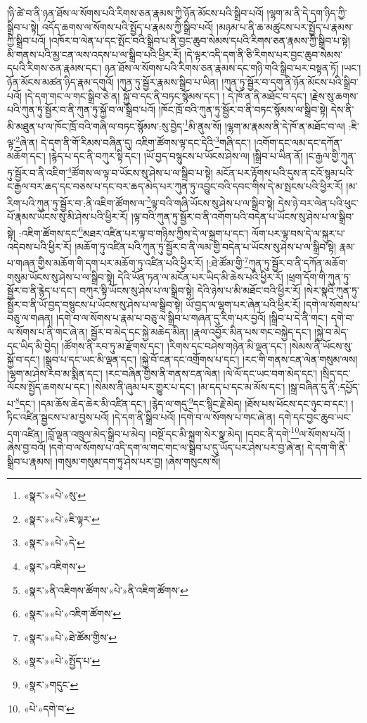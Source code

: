 །ཉི་ཚེ་བ་ནི་ཉན་ཐོས་ལ་སོགས་པའི་རིགས་ཅན་རྣམས་ཀྱི་ཉོན་མོངས་པའི་སྒྲིབ་པའོ། །ལྷག་མ་ནི་དེ་དག་ཉིད་ཀྱི་སྒྲིབ་པ་སྟེ། འདོད་ཆགས་ལ་སོགས་པའི་སྤྱོད་པ་རྣམས་ཀྱི་སྒྲིབ་པའོ། །མཉམ་པ་ནི་ཆ་མཚུངས་པར་སྤྱོད་པ་རྣམས་ཀྱི་སྒྲིབ་པའོ། །འཁོར་བ་ལེན་པ་དང་སྤོང་བའི་སྒྲིབ་པ་ནི་བྱང་ཆུབ་སེམས་དཔའི་རིགས་ཅན་རྣམས་ཀྱི་སྒྲིབ་པ་སྟེ། མི་གནས་པའི་མྱ་ངན་ལས་འདས་པ་ལ་སྒྲིབ་པའི་ཕྱིར་རོ། །དེ་ལྟར་འདི་དག་ནི་ཅི་རིགས་པར་བྱང་ཆུབ་སེམས་དཔའི་རིགས་ཅན་རྣམས་དང་། ཉན་ཐོས་ལ་སོགས་པའི་རིགས་ཅན་རྣམས་དང་གཉི་གའི་སྒྲིབ་པར་བསྟན་ཏོ། །ཡང་། ཉོན་མོངས་མཚན་ཉིད་རྣམ་དགུའོ། །ཀུན་ཏུ་སྦྱོར་རྣམས་སྒྲིབ་པ་ཡིན། །ཀུན་ཏུ་སྦྱོར་བ་དགུ་ནི་ཉོན་མོངས་པའི་སྒྲིབ་པའོ། །དེ་དག་གང་ལ་གང་སྒྲིབ་ཅེ་ན། སྐྱོ་བ་དང་ནི་བཏང་སྙོམས་དང་། །
དེ་ཁོ་ན་ནི་མཐོང་བ་དང་། །རྗེས་སུ་ཆགས་པའི་ཀུན་ཏུ་སྦྱོར་བ་ནི་ཀུན་ཏུ་སྐྱོ་བ་ལ་སྒྲིབ་པའོ། །ཁོང་ཁྲོ་བའི་ཀུན་ཏུ་སྦྱོར་བ་ནི་བཏང་སྙོམས་ལ་སྒྲིབ་སྟེ། དེས་ནི་མི་མཐུན་པ་ལ་ཁོང་ཁྲོ་བའི་གཞི་ལ་བཏང་སྙོམས་:སུ་བྱེད་\footnote{«སྣར་»«པེ་»སུ་}མི་ནུས་སོ། །ལྷག་མ་རྣམས་ནི་དེ་ཁོ་ན་མཐོང་བ་ལ། :ཇི་ལྟ་\footnote{«སྣར་»«པེ་»ཇི་ལྟར་}ཞེ་ན། དེ་དག་ནི་གོ་རིམས་བཞིན་དུ། འཇིག་ཚོགས་ལྟ་དང་དེའི་\footnote{«སྣར་»«པེ་»དེ་}གཞི་དང་། །འགོག་དང་ལམ་དང་དཀོན་མཆོག་དང་། །རྙེད་པ་དང་ནི་བཀུར་སྟི་དང་། །ཡོ་བྱད་བསྙུངས་པ་ཡོངས་ཤེས་ལ། །སྒྲིབ་པ་ཡིན་ནོ། །ང་རྒྱལ་གྱི་ཀུན་ཏུ་སྦྱོར་བ་ནི་འཇིག་\footnote{«སྣར་»འཇིགས་}ཚོགས་ལ་ལྟ་བ་ཡོངས་སུ་ཤེས་པ་ལ་སྒྲིབ་པ་སྟེ། མངོན་པར་རྟོགས་པའི་དུས་ན་ངའོ་སྙམ་པའི་ང་རྒྱལ་བར་ཆད་དང་བཅས་པ་དང་བར་ཆད་མེད་པར་ཀུན་ཏུ་འབྱུང་བའི་དབང་གིས་དེ་མ་སྤངས་པའི་ཕྱིར་རོ། །མ་རིག་པའི་ཀུན་ཏུ་སྦྱོར་བ་:ནི་འཇིག་ཚོགས་ལ་\footnote{«སྣར་»ནི་འཇིགས་ཚོགས་«པེ་»ནི་འཇིག་ཚོགས་}ལྟ་བའི་གཞི་ཡོངས་སུ་ཤེས་པ་ལ་སྒྲིབ་སྟེ། དེས་ཉེ་བར་ལེན་པའི་ཕུང་པོ་རྣམས་ཡོངས་སུ་མི་ཤེས་པའི་ཕྱིར་རོ། །ལྟ་བའི་ཀུན་ཏུ་སྦྱོར་བ་ནི་འགོག་པའི་བདེན་པ་ཡོངས་སུ་ཤེས་པ་ལ་སྒྲིབ་སྟེ། :འཇིག་ཚོགས་དང་\footnote{«སྣར་»«པེ་»འཇིག་ཚོགས་}མཐར་འཛིན་པར་ལྟ་བ་གཉིས་ཀྱིས་དེ་ལ་སྐྲག་པ་དང་། ལོག་པར་ལྟ་བས་དེ་ལ་སྐུར་པ་འདེབས་པའི་ཕྱིར་རོ། །མཆོག་ཏུ་འཛིན་པའི་ཀུན་ཏུ་སྦྱོར་བ་ནི་ལམ་གྱི་བདེན་པ་ཡོངས་སུ་ཤེས་པ་ལ་སྒྲིབ་སྟེ། རྣམ་པ་གཞན་གྱིས་མཆོག་གི་དག་པར་མཆོག་ཏུ་འཛིན་པའི་ཕྱིར་རོ། །:ཐེ་ཚོམ་གྱི་\footnote{«སྣར་»«པེ་»ཐེ་ཚོམ་གྱིས་}ཀུན་ཏུ་སྦྱོར་བ་ནི་དཀོན་མཆོག་གསུམ་ཡོངས་སུ་ཤེས་པ་ལ་སྒྲིབ་སྟེ། དེའི་ཡོན་ཏན་ལ་མངོན་པར་ཡིད་མི་ཆེས་པའི་ཕྱིར་རོ། །ཕྲག་དོག་གི་ཀུན་ཏུ་སྦྱོར་བ་ནི་རྙེད་པ་དང་། བཀུར་སྟི་ཡོངས་སུ་ཤེས་པ་ལ་སྒྲིབ་སྟེ། དེའི་ཉེས་པ་མི་མཐོང་བའི་ཕྱིར་རོ། །སེར་སྣའི་ཀུན་ཏུ་སྦྱོར་བ་ནི་ཡོ་བྱད་བསྙུངས་པ་ཡོངས་སུ་ཤེས་པ་ལ་སྒྲིབ་སྟེ། ཡོ་བྱད་ལ་ལྷག་པར་ཞེན་པའི་ཕྱིར་རོ། །དགེ་ལ་སོགས་པ་བཅུ་ལ་གཞན། །དགེ་བ་ལ་སོགས་པ་རྣམ་པ་བཅུ་ལ་སྒྲིབ་པ་གཞན་དུ་རིག་པར་བྱའོ། །སྒྲིབ་པ་དེ་ནི་གང་། དགེ་བ་ལ་སོགས་པ་ནི་གང་ཞེ་ན། སྦྱོར་བ་མེད་དང་སྐྱེ་མཆེད་མིན། །རྣལ་འབྱོར་མིན་པས་གང་བསྐྱེད་དང་། །སྐྱེ་བ་མེད་དང་ཡིད་མི་བྱེད། །ཚོགས་ནི་རབ་ཏུ་མ་རྫོགས་དང་། །རིགས་དང་བཤེས་གཉེན་མི་ལྡན་དང་། །སེམས་ནི་ཡོངས་སུ་སྐྱོ་བ་དང་། །སྒྲུབ་པ་དང་ཡང་མི་ལྡན་དང་། །སྐྱེ་བོ་ངན་དང་འགྲོགས་པ་དང་། །རང་གི་གནས་ངན་ལེན་གསུམ་ལས། །ལྷག་མ་ཤེས་རབ་མ་སྨིན་དང་། །རང་བཞིན་གྱིས་ནི་གནས་ངན་ལེན། །ལེ་ལོ་དང་ཡང་བག་མེད་དང་། །སྲིད་དང་ལོངས་སྤྱོད་ཆགས་པ་དང་། །སེམས་ནི་ཞུམ་པར་གྱུར་པ་དང་། །མ་དད་པ་དང་མ་མོས་དང་། །སྒྲ་བཞིན་དུ་ནི་:དཔྱོད་པ་\footnote{«སྣར་»«པེ་»སྤྱོད་པ་}དང་། །དམ་ཆོས་ཆེད་ཆེར་མི་འཛིན་དང་། །རྙེད་ལ་གདུ་\footnote{«སྣར་»གདུང་}དང་སྙིང་རྗེ་མེད། །ཐོས་པས་ཕོངས་དང་ཉུང་བ་དང་། །ཏིང་འཛིན་སྦྱངས་པ་མ་བྱས་པའོ། །དེ་དག་ནི་སྒྲིབ་པའོ། །དགེ་བ་ལ་སོགས་པ་གང་ཞེ་ན། དགེ་དང་བྱང་ཆུབ་ཡང་དག་འཛིན། །བློ་ལྡན་འཁྲུལ་མེད་སྒྲིབ་པ་མེད། །བསྔོ་དང་མི་སྐྲག་སེར་སྣ་མེད། །དབང་ནི་དགེ་\footnote{«པེ་»དགེ་བ་}ལ་སོགས་པའོ། །ཞེས་བྱ་བའོ། །དགེ་བ་ལ་སོགས་པ་འདི་དག་ལ་གང་གང་ལ་སྒྲིབ་པ་དུ་ཡོད་པར་ཤེས་པར་བྱ་ཞེ་ན། དེ་དག་གི་ནི་སྒྲིབ་པ་རྣམས། །གསུམ་གསུམ་དག་ཏུ་ཤེས་པར་བྱ། །ཞེས་གསུངས་སོ། 